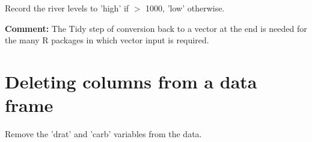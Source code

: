\documentclass[11pt]{article}
\begin{document}
Record the river levels to 'high' if $>$ 1000, 'low' otherwise.

\begin{parcolumns}[rulebetween=true]{2}


\hspace{0.1in}


\end{parcolumns}

\textbf{Comment:}
The Tidy step of conversion back to a vector at the end is needed for
the many R packages in which vector input is required.  

\section*{Deleting columns from a data frame}

Remove the 'drat' and 'carb' variables from the data.
\end{document}
